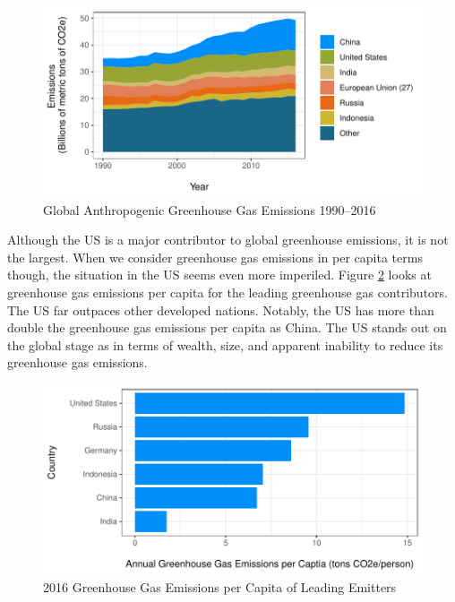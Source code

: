\begin{figure}
\caption{Global Anthropogenic Greenhouse Gas Emissions 1990--2016 \label{global_ghg}}
\centering
\includegraphics[width=\textwidth]{figures/chapter1_figures/ghg_global.pdf}
\end{figure}

Although the US is a major contributor to global greenhouse emissions, it is not the largest. When we consider greenhouse gas emissions in per capita terms though, the situation in the US seems even more imperiled. Figure \ref{global_ghg_cap} looks at greenhouse gas emissions per capita for the leading greenhouse gas contributors. The US far outpaces other developed nations. Notably, the US has more than double the greenhouse gas emissions per capita as China. The US stands out on the global stage as in terms of wealth, size, and apparent inability to reduce its greenhouse gas emissions.

\begin{figure}
\caption{2016 Greenhouse Gas Emissions per Capita of Leading Emitters \label{global_ghg_cap}}
\centering
\includegraphics[scale=.9]{figures/chapter1_figures/ghg_cap.pdf}
\end{figure}



